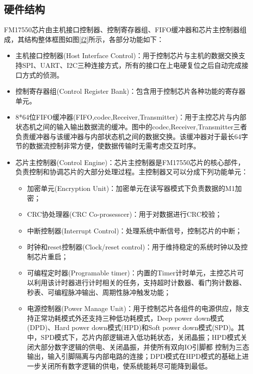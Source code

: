\documentclass[a4paper]{ctexart}
\begin{document}
\begin{spacing}{1.5}
\subsection{硬件结构}
FM17550芯片由主机接口控制器、控制寄存器组、FIFO缓冲器和芯片主控制器组成，其结构整体框图如图\ref{f2}所示，各部分功能如下：
\begin{itemize}
	\item 主机接口控制器(Host Interface Control)：用于控制芯片与主机的数据交换支持SPI、UART、I2C三种连接方式，所有的接口在上电硬复位之后自动完成接口方式的侦测。
	\item 控制寄存器组(Control Register Bank)：包含用于控制芯片各种功能的寄存器单元。
	\item 8*64位FIFO缓冲器(FIFO,codec,Receiver,Transmitter)：用于主控芯片与内部状态机之间的输入输出数据流的缓冲。图中的codec,Receiver,Transmitter三者负责缓冲器与该缓冲器与内部状态机之间的数据交换。该缓冲器对于最长64字节的数据流控制非常方便，使数据传输时无需考虑交互时序。
	\item 芯片主控制器(Control Engine)：芯片主控制器是FM17550芯片的核心部件，负责控制和协调芯片的大部分处理过程。主控制器又可以分成下列功能单元：
	\begin{itemize}
		\item 加密单元(Encryption Unit)：加密单元在读写器模式下负责数据的M1加密；
		\item CRC协处理器(CRC Co-prosesscer)：用于对数据进行CRC校验；
		\item 中断控制器(Interrupt Control)：处理系统中断信号，控制芯片的中断；
		\item 时钟和reset控制器(Clock/reset control)：用于维持稳定的系统时钟以及控制芯片重启；
		\item 可编程定时器(Programable timer)：内置的Timer计时单元，主控芯片可以利用该计时器进行计时相关的任务，支持超时计数器、看门狗计数器、秒表、可编程脉冲输出、周期性脉冲触发功能；
		\item 电源控制器(Power Manage Unit)：用于控制芯片各组件的电源供应，除支持正常功耗模式外还支持三种低功耗模式，Deep power down模式(DPD)、Hard power down模式(HPD)和Soft power down模式(SPD)。其中，SPD模式下，芯片内部逻辑进入低功耗状态，关闭晶振；HPD模式关闭大部分数字逻辑的供电、关闭晶振，并使所有双向IO引脚都 控制为三态输出，输入引脚隔离与内部电路的连接；DPD模式在HPD模式的基础上进一步关闭所有数字逻辑的供电，使系统能耗尽可能降到最低。
	\end{itemize}
\end{itemize}
\begin{figure}
	\centering

\end{figure}
\end{spacing}
\end{document}
